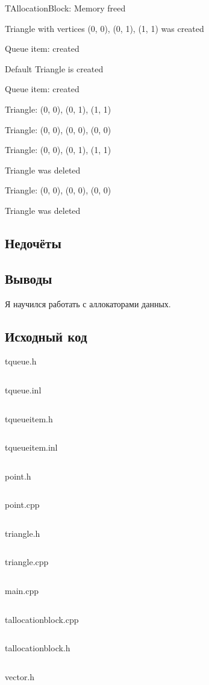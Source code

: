 \documentclass[12pt]{article}
\begin{document}
\begin{left}
TAllocationBlock: Memory freed

Triangle with vertices (0, 0), (0, 1), (1, 1) was created

Queue item: created

Default Triangle is created

Queue item: created

Triangle: (0, 0), (0, 1), (1, 1)

Triangle: (0, 0), (0, 0), (0, 0)

Triangle: (0, 0), (0, 1), (1, 1)

Triangle was deleted

Triangle: (0, 0), (0, 0), (0, 0)

Triangle was deleted

\end{left}

\subsection*{Недочёты}


\subsection*{Выводы}

Я научился работать с аллокаторами данных.


\vfill

\subsection*{Исходный код}

{\Huge tqueue.h}
\inputminted{C++}{tqueue.h}
    \pagebreak

{\Huge tqueue.inl}
\inputminted{C++}{tqueue.inl}
\pagebreak

{\Huge tqueueitem.h}
\inputminted{C++}{tqueueitem.h}
\pagebreak

{\Huge tqueueitem.inl}
\inputminted{C++}{tqueueitem.inl}
\pagebreak
    
{\Huge point.h}
\inputminted{C++}{point.h}
    \pagebreak

{\Huge point.cpp}
\inputminted{C++}{point.cpp}
    \pagebreak

{\Huge triangle.h}
\inputminted{C++}{triangle.h}
\pagebreak

{\Huge triangle.cpp}
\inputminted{C++}{triangle.cpp}
\pagebreak
    
{\Huge main.cpp}
\inputminted{C++}{main.cpp}
\pagebreak

{\Huge tallocationblock.cpp}
\inputminted{C++}{tallocationblock.cpp}
\pagebreak

{\Huge tallocationblock.h}
\inputminted{C++}{tallocationblock.h}
\pagebreak

{\Huge vector.h}
\inputminted{C++}{vector.h}
\pagebreak

    
\end{document}
